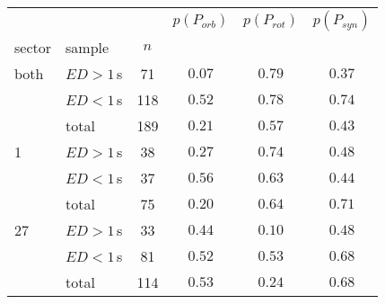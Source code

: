 \begin{tabular}{llcccc}
\hline
          &  &      & $p(P_{orb})$ & $p(P_{rot})$ & $p(P_{syn})$ \\
sector & sample &     $n$ &              &              &              \\
\hline
both & $ED>1\,$s &   71 &       $\mathbf{0.07}$ &       $0.79$ &       $0.37$ \\
          & $ED<1\,$s &  118 &       $0.52$ &       $0.78$ &       $0.74$ \\
          & total &  189 &       $0.21$ &       $0.57$ &       $0.43$ \\
1 & $ED>1\,$s &   38 &       $0.27$ &       $0.74$ &       $0.48$ \\
          & $ED<1\,$s &   37 &       $0.56$ &       $0.63$ &       $0.44$ \\
          & total &   75 &       $0.20$ &       $0.64$ &       $0.71$ \\
27 & $ED>1\,$s &   33 &       $0.44$ &       $0.10$ &       $0.48$ \\
          & $ED<1\,$s &   81 &       $0.52$ &       $0.53$ &       $0.68$ \\
          & total &  114 &       $0.53$ &       $0.24$ &       $0.68$ \\
\hline
\end{tabular}

